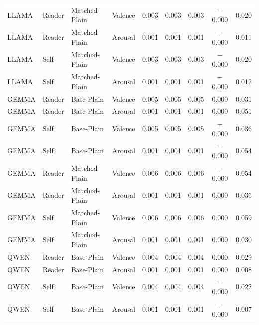 \begin{table}[htbp]
\begin{tabular}{llll ccccc}
LLAMA      & Reader   & Matched-Plain    & Valence  & 0.003      & 0.003      & 0.003      & $-$0.000           & 0.020        \\
LLAMA      & Reader   & Matched-Plain    & Arousal  & 0.001      & 0.001      & 0.001      & $-$0.000           & 0.011        \\
LLAMA      & Self     & Matched-Plain    & Valence  & 0.003      & 0.003      & 0.003      & $-$0.000           & 0.020        \\
LLAMA      & Self     & Matched-Plain    & Arousal  & 0.001      & 0.001      & 0.001      & $-$0.000           & 0.012        \\
GEMMA      & Reader   & Base-Plain       & Valence  & 0.005      & 0.005      & 0.005      & 0.000              & 0.031        \\
GEMMA      & Reader   & Base-Plain       & Arousal  & 0.001      & 0.001      & 0.001      & 0.000              & 0.051        \\
GEMMA      & Self     & Base-Plain       & Valence  & 0.005      & 0.005      & 0.005      & $-$0.000           & 0.036        \\
GEMMA      & Self     & Base-Plain       & Arousal  & 0.001      & 0.001      & 0.001      & $-$0.000           & 0.054        \\
GEMMA      & Reader   & Matched-Plain    & Valence  & 0.006      & 0.006      & 0.006      & $-$0.000           & 0.054        \\
GEMMA      & Reader   & Matched-Plain    & Arousal  & 0.001      & 0.001      & 0.001      & 0.000              & 0.036        \\
GEMMA      & Self     & Matched-Plain    & Valence  & 0.006      & 0.006      & 0.006      & 0.000              & 0.059        \\
GEMMA      & Self     & Matched-Plain    & Arousal  & 0.001      & 0.001      & 0.001      & 0.000              & 0.030        \\
QWEN       & Reader   & Base-Plain       & Valence  & 0.004      & 0.004      & 0.004      & 0.000              & 0.029        \\
QWEN       & Reader   & Base-Plain       & Arousal  & 0.001      & 0.001      & 0.001      & 0.000              & 0.008        \\
QWEN       & Self     & Base-Plain       & Valence  & 0.004      & 0.004      & 0.004      & $-$0.000           & 0.022        \\
QWEN       & Self     & Base-Plain       & Arousal  & 0.001      & 0.001      & 0.001      & $-$0.000           & 0.007        \\

\end{tabular}
\end{table}
